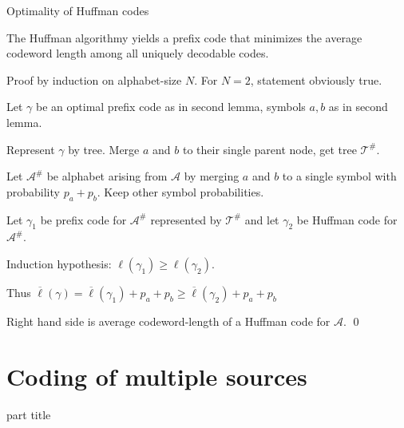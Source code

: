 \begin{frame}{Optimality of Huffman codes}
\begin{theorem}
The Huffman algorithmy yields a prefix code that minimizes the average codeword length among 
all uniquely decodable codes. 
\end{theorem}
\bit
\item Proof by induction on alphabet-size $N$. For $N=2$, statement obviously true. 
\item Let $\gamma$ be an optimal prefix code  as in second lemma, symbols $a, b$ as in second lemma. 
\item Represent $\gamma$ by tree. Merge $a$ and $b$ to their single parent node, get tree $\mathcal{T}^{\#}$.
\item Let $\mathcal{A}^{\#}$ be alphabet arising from $\mathcal{A}$ by merging $a$ and $b$ to a single symbol 
with probability $p_a+p_b$. Keep other symbol probabilities. 
\item Let $\gamma_1$ be prefix code for $\mathcal{A}^{\#}$ represented by $\mathcal{T}^{\#}$ and let $\gamma_{2}$ be Huffman code for $\mathcal{A}^{\#}$.
\item Induction hypothesis: $\ell(\gamma_1)\geq \ell(\gamma_2)$. 
\item Thus $\overline{\ell}(\gamma)=\overline{\ell}(\gamma_1)+p_a+p_b\geq \overline{\ell}(\gamma_2)+p_a+p_b$
\item Right hand side is average codeword-length of a Huffman code for $\mathcal{A}$.
\qed 
\eit
\end{frame}



\section{Coding of multiple sources}


\begin{frame}
 \vspace{8.0ex}
\begin{center}
\begin{beamercolorbox}[sep=12pt,center]{part title}
\insertsection\par
\end{beamercolorbox}
\end{center}
\end{frame}

